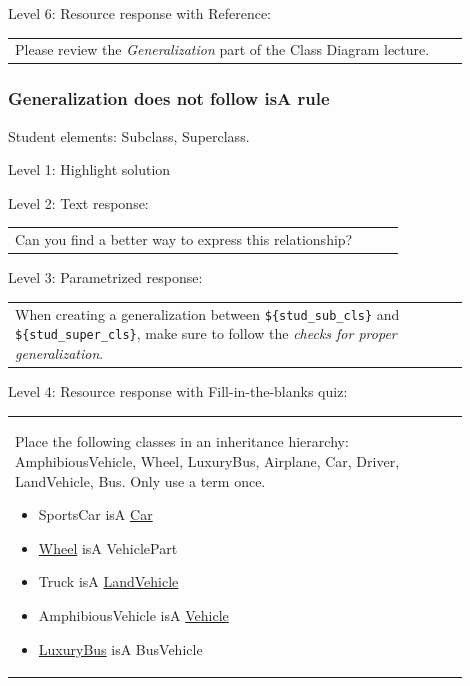 \noindent Level 6: Resource response with Reference: \medskip

\begin{tabular}{|p{0.9\linewidth}}
Please review the \textit{Generalization} part of the Class Diagram lecture.
\end{tabular} \medskip


\subsubsection{Generalization does not follow isA rule}

Student elements: Subclass, Superclass.  \medskip

\noindent Level 1: Highlight solution  \medskip

\noindent Level 2: Text response: \medskip

\begin{tabular}{|p{0.9\linewidth}}
Can you find a better way to express this relationship?
\end{tabular} \medskip

\noindent Level 3: Parametrized response: \medskip

\begin{tabular}{|p{0.9\linewidth}}
When creating a generalization between \verb|${stud_sub_cls}| and \verb|${stud_super_cls}|, make sure to follow the \textit{checks for proper generalization}.
\end{tabular} \medskip

\noindent Level 4: Resource response with Fill-in-the-blanks quiz: \medskip

\begin{tabular}{|p{0.9\linewidth}}

Place the following classes in an inheritance hierarchy: AmphibiousVehicle, Wheel, LuxuryBus, Airplane, Car, Driver, LandVehicle, Bus. Only use a term once.

\begin{itemize}
    \item SportsCar isA \underline{Car}
    \item \underline{Wheel} isA VehiclePart
    \item Truck isA \underline{LandVehicle}
    \item AmphibiousVehicle isA \underline{Vehicle}
    \item \underline{LuxuryBus} isA BusVehicle
\end{itemize}

\end{tabular} \medskip

